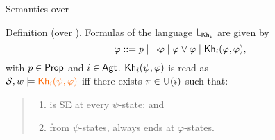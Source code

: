 \documentclass{beamer}
\begin{document}
\begin{frame}{Semantics over \ults}

    \begin{small}
        \begin{block}{Definition (\KHilogic over \ults).}
            Formulas of the language $\mathsf{L}_{\operatorname{\sf Kh}_i}$ are given by
            \[
                \varphi ::= p \mid \neg\varphi \mid \varphi\vee\varphi \mid {\operatorname{\sf Kh}_i}(\varphi,\varphi),
            \]
            with $p \in {\rm \sf Prop}$ and $i \in {\rm \sf Agt}$. \pause ${\operatorname{\sf Kh}_i}(\psi,\varphi)$ is read as  \pause
            \\ 
        \medskip
        $\modults,w \models \orange{\khi(\psi,\varphi)}$ iff there exists  $\pi \in \operatorname{U}(i)$ such that:

        \begin{quote}
            \begin{enumerate}
            \item {} is SE at every $\psi$-state; and
            \item from $\psi$-states,  always ends at $\varphi$-states.
            \end{enumerate}
        \end{quote}
        \end{block}



    \end{small}


\end{frame}

\end{document}
